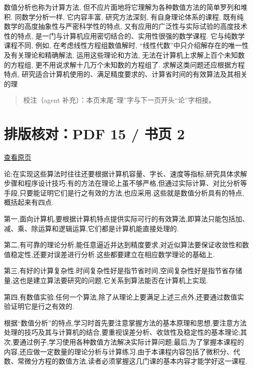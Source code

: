 \documentclass[
  10pt,
  a4paper,
]{article}
\begin{document}
数值分析也称为计算方法,
但不应片面地将它理解为各种数值方法的简单罗列和堆积. 同数学分析一样,
它内容丰富, 研究方法深刻, 有自身理论体系的课程,
既有纯数学的高度抽象性与严密科学性的特点,
又有应用的广泛性与实际试验的高度技术性的特点,
是一门与计算机应用密切结合的、实用性很强的数学课程. 它与纯数学课程不同,
例如, 在考虑线性方程组数值解时,
``线性代数''中只介绍解存在的唯一性及有关理论和精确解法,
运用这些理论和方法, 无法在计算机上求解上百个未知数的方程组,
更不用说求解十几万个未知数的方程组了. 求解这类问题还应根据方程特点,
研究适合计算机使用的、满足精度要求的、计算省时间的有效算法及其相关的理

\begin{quote}
校注（agent 补充）：本页末尾``理''字与下一页开头``论''字相接。
\end{quote}

\newpage

\section{排版核对：PDF 15 / 书页
2}\label{ux6392ux7248ux6838ux5bf9pdf-15-ux4e66ux9875-2}

\href{../../../source-images/pdf-015.jpeg}{查看原页}

论;在实现这些算法时往往还要根据计算机容量、字长、速度等指标,研究具体求解步骤和程序设计技巧;有的方法在理论上虽不够严格,但通过实际计算、对比分析等手段,只要能证明它们是行之有效的方法,也应采用.这些就是数值分析具有的特点,概括起来有四点.

第一,面向计算机,要根据计算机特点提供实际可行的有效算法,即算法只能包括加、减、乘、除运算和逻辑运算,它们都是计算机能直接处理的.

第二,有可靠的理论分析,能任意逼近并达到精度要求,对近似算法要保证收敛性和数值稳定性,还要对误差进行分析.这些都要建立在相应数学理论的基础上.

第三,有好的计算复杂性.时间复杂性好是指节省时间,空间复杂性好是指节省存储量,这也是建立算法要研究的问题,它关系到算法能否在计算机上实现.

第四,有数值实验.任何一个算法,除了从理论上要满足上述三点外,还要通过数值实验证明它是行之有效的.

根据``数值分析''的特点,学习时首先要注意掌握方法的基本原理和思想,要注意方法处理的技巧及其与计算机的结合,要重视误差分析、收敛性及稳定性的基本理论;其次,要通过例子,学习使用各种数值方法解决实际计算问题;最后,为了掌握本课程的内容,还应做一定数量的理论分析与计算练习.由于本课程内容包括了微积分、代数、常微分方程的数值方法,读者必须掌握这几门课的基本内容才能学好这一课程.
\end{document}
